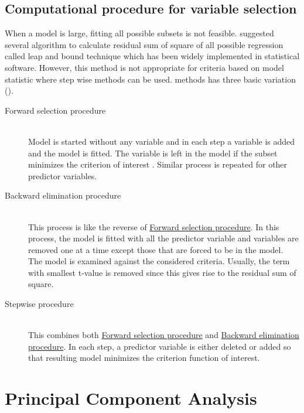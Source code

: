 \documentclass[12pt, lot, lof]{thesis}\usepackage[]{graphicx}\usepackage[]{color}
\begin{document}
\subsection{Computational procedure for variable selection}
\label{ssec:compProcVarSelction}
When a model is large, fitting all possible subsets is not feasible. \citet{furnival1974regressions} suggested several algorithm to calculate residual sum of square of all possible regression called leap and bound technique which has been widely implemented in statistical software. However, this method is not appropriate for criteria based on model statistic where step wise methods can be used.  methods has three basic variation (\cite[p.~221]{weisberg2005applied}).

\begin{description}
\item[Forward selection procedure \label{itm:forwardSelection}] \hfill\\
Model is started without any variable and in each step a variable is added and the model is fitted. The variable is left in the model if the subset minimizes the criterion of interest . Similar process is repeated for other predictor variables.

\item[Backward elimination procedure \label{itm:backwardElimination}]\hfill\\
This process is like the reverse of \hyperref[itm:forwardSelection]{Forward selection procedure}. In this process, the model is fitted with all the predictor variable and variables are removed one at a time except those that are forced to be in the model. The model is examined against the considered criteria. Usually, the term with smallest t-value is removed since this gives rise to the residual sum of square.

\item[Stepwise procedure \label{itm:stepwise}]\hfill\\
This combines both \hyperref[itm:forwardSelection]{Forward selection procedure} and \hyperref[itm:backwardElimination]{Backward elimination procedure}. In each step, a predictor variable is either deleted or added so that resulting model minimizes the criterion function of interest.

\end{description}

\section{Principal Component Analysis}
\label{sec:pca}
\end{document}
